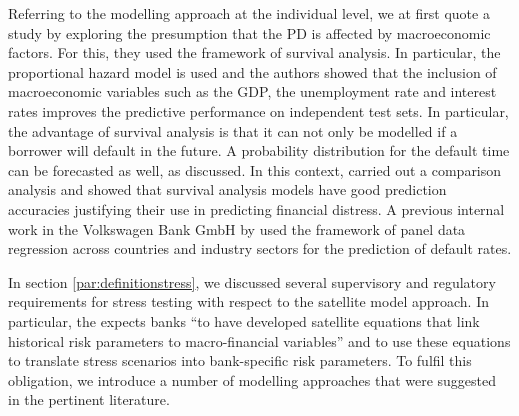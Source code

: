 \documentclass[a4paper, 11pt]{scrreprt}
\begin{document}
Referring to the modelling approach at the individual level, we at first quote a study by
\textcite{bellotti2009credit} exploring the presumption that the PD is affected by macroeconomic factors. For this, they used the framework of survival analysis. In particular, the \textcite{cox1984survival} proportional hazard model is used and the authors showed that the inclusion of macroeconomic variables such as the GDP, the unemployment rate and interest rates improves the predictive performance on independent test sets. In particular, the advantage of survival analysis is that it can not only be modelled if a borrower will default in the future. A probability distribution for the default time can be forecasted as well, as \textcite{banasik1999notifbutwhen} discussed.
In this context, \textcite{gepp2015predicting} carried out a comparison analysis and showed that survival analysis models have good prediction accuracies justifying their use in predicting financial distress.
A previous internal work in the Volkswagen Bank GmbH by \textcite{ivanchenko2017predicting} used the framework of panel data regression across countries and industry sectors for the prediction of default rates.

In section \ref{par:definitionstress}, we discussed several supervisory and regulatory requirements for stress testing with respect to the satellite model approach. 
In particular, the \textcite[p. 17]{ecb2018srep} expects banks ``to have developed satellite equations that link historical risk parameters to macro-financial variables'' and to use these equations to translate stress scenarios into bank-specific risk parameters. To fulfil this obligation, we introduce a number of modelling approaches that were suggested in the pertinent literature. 
\end{document}
